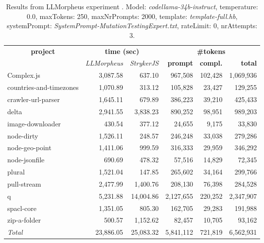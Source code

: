 
\begin{table*}[hbt!]
\centering
{\scriptsize
\begin{tabular}{l||r|r|r|r|r}
\multicolumn{1}{c|}{\bf project} & \multicolumn{2}{|c|}{\bf time (sec)} & \multicolumn{3}{|c|}{\bf \#tokens} \\
               & {\it LLMorpheus} & {\it StrykerJS} & {\bf prompt} & {\bf compl.} & {\bf total} \\
\hline
  Complex.js & 3,087.58 & 637.10 & 967,508 & 102,428 & 1,069,936 \\ 
countries-and-timezones & 1,070.89 & 313.12 & 105,828 & 23,427 & 129,255 \\ 
crawler-url-parser & 1,645.11 & 679.89 & 386,223 & 39,210 & 425,433 \\ 
delta & 2,941.55 & 3,838.23 & 890,252 & 98,951 & 989,203 \\ 
image-downloader & 430.54 & 377.12 & 24,655 & 9,175 & 33,830 \\ 
node-dirty & 1,526.11 & 248.57 & 246,248 & 33,038 & 279,286 \\ 
node-geo-point & 1,411.06 & 999.59 & 316,333 & 29,959 & 346,292 \\ 
node-jsonfile & 690.69 & 478.32 & 57,516 & 14,829 & 72,345 \\ 
plural & 1,521.04 & 147.85 & 265,602 & 34,164 & 299,766 \\ 
pull-stream & 2,477.99 & 1,400.76 & 208,130 & 76,398 & 284,528 \\ 
q & 5,231.88 & 14,004.86 & 2,127,655 & 220,252 & 2,347,907 \\ 
spacl-core & 1,351.05 & 805.30 & 162,705 & 29,283 & 191,988 \\ 
zip-a-folder & 500.57 & 1,152.62 & 82,457 & 10,705 & 93,162 \\ 
\hline
  \textit{Total} & 23,886.05 & 25,083.32 & 5,841,112 & 721,819 & 6,562,931 \\
  \end{tabular}
  }
  \\[2mm]
  \caption{Results from LLMorpheus experiment .
    Model: \textit{codellama-34b-instruct}, 
    temperature: 0.0, 
    maxTokens: 250, 
    maxNrPrompts: 2000, 
    template: \textit{template-full.hb}, 
    systemPrompt: \textit{SystemPrompt-MutationTestingExpert.txt}, 
    rateLimit: 0, 
    nrAttempts: 3.  
  }
  \label{table:Cost:run314:codellama-34b-instruct:template-full.hb:0.0}
\end{table*}